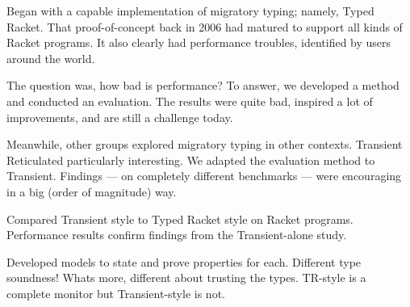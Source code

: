 Began with a capable implementation of migratory typing; namely, Typed Racket.
That proof-of-concept back in 2006 had matured to support all kinds of Racket programs.
It also clearly had performance troubles, identified by users around the world.

The question was, how bad is performance?
To answer, we developed a method and conducted an evaluation.
The results were quite bad, inspired a lot of improvements, and are still a challenge today.

Meanwhile, other groups explored migratory typing in other contexts.
Transient Reticulated particularly interesting.
We adapted the evaluation method to Transient.
Findings --- on completely different benchmarks --- were encouraging in a big (order of magnitude) way.

Compared Transient style to Typed Racket style on Racket programs.
Performance results confirm findings from the Transient-alone study.

Developed models to state and prove properties for each.
Different type soundness!
Whats more, different about trusting the types.
TR-style is a complete monitor but Transient-style is not.


